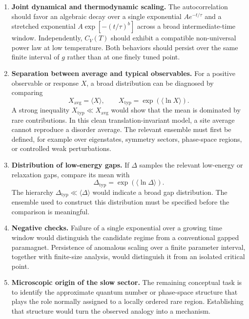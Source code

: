 \documentclass[11pt]{article}
\begin{document}
\begin{enumerate}
  \item \textbf{Joint dynamical and thermodynamic scaling.}
  The autocorrelation should favor an algebraic decay over a single exponential
  $A e^{-t/\tau}$ and a stretched exponential
  $A\exp[-(t/\tau)^b]$ across a broad intermediate-time window. Independently,
  $C_V(T)$ should exhibit a compatible non-universal power law at low temperature.
  Both behaviors should persist over the same finite interval of $g$ rather than at
  one finely tuned point.

  \item \textbf{Separation between average and typical observables.}
  For a positive observable or response $X$, a broad distribution can be diagnosed
  by comparing
  \begin{equation}
    X_{\mathrm{avg}}=\langle X\rangle,
    \qquad
    X_{\mathrm{typ}}=\exp\!\left(\langle\ln X\rangle\right).
  \end{equation}
  A strong inequality $X_{\mathrm{typ}}\ll X_{\mathrm{avg}}$ would show that the
  mean is dominated by rare contributions. In this clean translation-invariant
  model, a site average cannot reproduce a disorder average. The relevant ensemble
  must first be defined, for example over eigenstates, symmetry sectors, phase-space
  regions, or controlled weak perturbations.

  \item \textbf{Distribution of low-energy gaps.}
  If $\Delta$ samples the relevant low-energy or relaxation gaps, compare its mean
  with
  \begin{equation}
    \Delta_{\mathrm{typ}}
    =\exp\!\left(\langle\ln\Delta\rangle\right).
  \end{equation}
  The hierarchy $\Delta_{\mathrm{typ}}\ll\langle\Delta\rangle$ would indicate a
  broad gap distribution. The ensemble used to construct this distribution must be
  specified before the comparison is meaningful.

  \item \textbf{Negative checks.}
  Failure of a single exponential over a growing time window would distinguish the
  candidate regime from a conventional gapped paramagnet. Persistence of anomalous
  scaling over a finite parameter interval, together with finite-size analysis,
  would distinguish it from an isolated critical point.

  \item \textbf{Microscopic origin of the slow sector.}
  The remaining conceptual task is to identify the approximate quantum number or
  phase-space structure that plays the role normally assigned to a locally ordered
  rare region. Establishing that structure would turn the observed analogy into a
  mechanism.
\end{enumerate}
\end{document}
